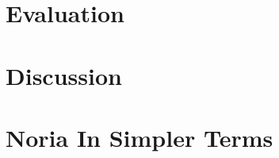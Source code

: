 \documentclass[fontsize=12pt,paper=letter,draft=true]{scrbook}
\begin{document}


\chapter{Evaluation}



\chapter{Discussion}



\appendix
\chapter{Noria In Simpler Terms}



\backmatter

\begin{spacing}{1}
\printbibliography
\end{spacing}
\end{document}
